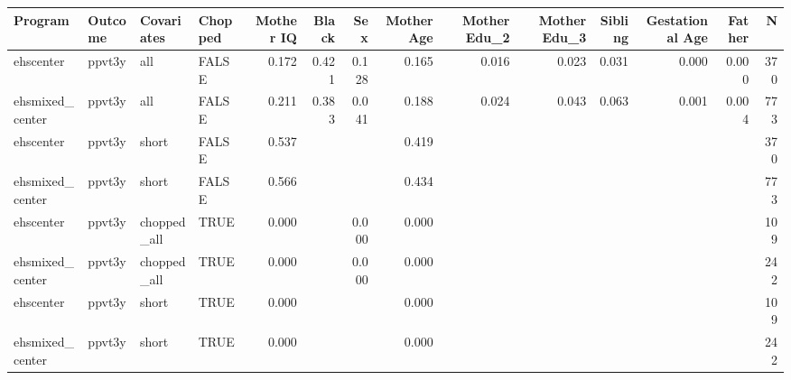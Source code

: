 \begin{table}[ht]
\centering
\begin{tabular}{llllrrrrrrrrrr}
  \hline
Program & Outcome & Covariates & Chopped & Mother IQ & Black & Sex & Mother Age & Mother Edu\_2 & Mother Edu\_3 & Sibling & Gestational Age & Father & N \\ 
  \hline
ehscenter & ppvt3y & all & FALSE & 0.172 & 0.421 & 0.128 & 0.165 & 0.016 & 0.023 & 0.031 & 0.000 & 0.000 & 370 \\ 
  ehsmixed\_center & ppvt3y & all & FALSE & 0.211 & 0.383 & 0.041 & 0.188 & 0.024 & 0.043 & 0.063 & 0.001 & 0.004 & 773 \\ 
  ehscenter & ppvt3y & short & FALSE & 0.537 &  &  & 0.419 &  &  &  &  &  & 370 \\ 
  ehsmixed\_center & ppvt3y & short & FALSE & 0.566 &  &  & 0.434 &  &  &  &  &  & 773 \\ 
  ehscenter & ppvt3y & chopped\_all & TRUE & 0.000 &  & 0.000 & 0.000 &  &  &  &  &  & 109 \\ 
  ehsmixed\_center & ppvt3y & chopped\_all & TRUE & 0.000 &  & 0.000 & 0.000 &  &  &  &  &  & 242 \\ 
  ehscenter & ppvt3y & short & TRUE & 0.000 &  &  & 0.000 &  &  &  &  &  & 109 \\ 
  ehsmixed\_center & ppvt3y & short & TRUE & 0.000 &  &  & 0.000 &  &  &  &  &  & 242 \\ 
   \hline
\end{tabular}
\end{table}
